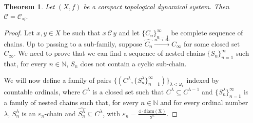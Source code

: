 \documentclass[10pt,a4paper]{article}
\theoremstyle{definition}
\theoremstyle{remark}
\theoremstyle{plain}
\newtheorem{thm}[defi]{Theorem}
\begin{document}
\begin{thm}\label{mainth}
    Let $(X,f)$ be a compact topological dynamical system. Then $\mathcal{C}=\mathcal{C}_\preceq$.
\end{thm}
\begin{proof}
    Let $x,y\in X$ be such that $x\,\mathcal{C}\,y$ and let $\{C_n\}_{n=1}^\infty$ be complete sequence of chains. Up to passing to a sub-family, suppose $\widehat{C_n}\xrightarrow{n\to\infty}C_\infty$ for some closed set $C_\infty$. We need to prove that we can find a sequence of nested chains $\{S_n\}_{n=1}^\infty$ such that, for every $n\in\mathbb{N}$, $S_n$ does not contain a cyclic sub-chain. 

    We will now define a family of pairs $\{(C^\lambda, \{S_n^\lambda\}_{n=1}^\infty)\}_{\lambda<\omega_1}$ indexed by countable ordinals, where $C^\lambda$ is a closed set such that $C^\lambda\subseteq C^{\lambda-1}$ and $\{S^\lambda_n\}_{n=1}^\infty$ is a family of nested chains such that, for every $n\in\mathbb{N}$ and for every ordinal number $\lambda$, $S^\lambda_n$ is an $\varepsilon_n$-chain and $\widehat{S^\lambda_n}\subseteq C^\lambda$, with $\varepsilon_n=\frac{4\cdot\operatorname{diam(X)}}{2^n}$.


\end{proof}
\end{document}
